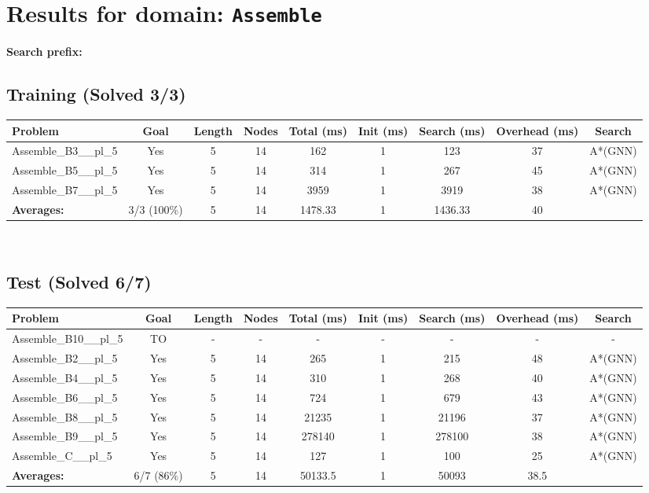 \documentclass{article}
\begin{document}
\section*{Results for domain: \texttt{Assemble}}
\textbf{Search prefix:} 
\\[0.5cm]
\subsection*{Training (Solved 3/3)}
\begin{tabular}{lcccccccc}
\toprule
Problem & Goal & Length & Nodes & Total (ms) & Init (ms) & Search (ms) & Overhead (ms) & Search \\
\midrule
Assemble\_B3\_\_pl\_5 & Yes & 5 & 14 & 162 & 1 & 123 & 37 & A*(GNN) \\
Assemble\_B5\_\_pl\_5 & Yes & 5 & 14 & 314 & 1 & 267 & 45 & A*(GNN) \\
Assemble\_B7\_\_pl\_5 & Yes & 5 & 14 & 3959 & 1 & 3919 & 38 & A*(GNN) \\
\textbf{Averages:} & 3/3 (100\%) & 5 & 14 & 1478.33 & 1 & 1436.33 & 40 & \\
\bottomrule
\end{tabular}
\\[0.7cm]
\subsection*{Test (Solved 6/7)}
\begin{tabular}{lcccccccc}
\toprule
Problem & Goal & Length & Nodes & Total (ms) & Init (ms) & Search (ms) & Overhead (ms) & Search \\
\midrule
Assemble\_B10\_\_pl\_5 & TO & - & - & - & - & - & - & - \\
Assemble\_B2\_\_pl\_5 & Yes & 5 & 14 & 265 & 1 & 215 & 48 & A*(GNN) \\
Assemble\_B4\_\_pl\_5 & Yes & 5 & 14 & 310 & 1 & 268 & 40 & A*(GNN) \\
Assemble\_B6\_\_pl\_5 & Yes & 5 & 14 & 724 & 1 & 679 & 43 & A*(GNN) \\
Assemble\_B8\_\_pl\_5 & Yes & 5 & 14 & 21235 & 1 & 21196 & 37 & A*(GNN) \\
Assemble\_B9\_\_pl\_5 & Yes & 5 & 14 & 278140 & 1 & 278100 & 38 & A*(GNN) \\
Assemble\_C\_\_pl\_5 & Yes & 5 & 14 & 127 & 1 & 100 & 25 & A*(GNN) \\
\textbf{Averages:} & 6/7 (86\%) & 5 & 14 & 50133.5 & 1 & 50093 & 38.5 & \\
\bottomrule
\end{tabular}
\\[0.7cm]
\end{document}
